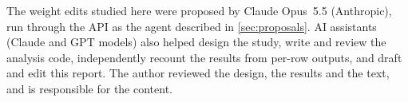 The weight edits studied here were proposed by Claude Opus~5.5 (Anthropic), run through the API as the agent
described in \cref{sec:proposals}. AI assistants (Claude and GPT models) also helped design the study, write and
review the analysis code, independently recount the results from per-row outputs, and draft and edit this report.
The author reviewed the design, the results and the text, and is responsible for the content.
